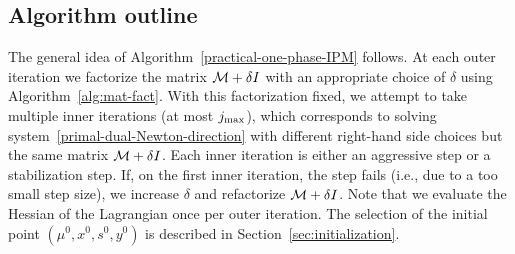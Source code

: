 \documentclass{article}
\begin{document}
\subsection{Algorithm outline}\label{sec:practical-alg-outline}

The general idea of Algorithm~\ref{practical-one-phase-IPM} follows. At each outer iteration we factorize the matrix $\mathcal{M} + \delta I$ with an appropriate choice of $\delta$ using Algorithm~\ref{alg:mat-fact}. With this factorization fixed, we attempt to take multiple inner iterations (at most $j_{\max}$), which corresponds to solving system~\eqref{primal-dual-Newton-direction} with different right-hand side choices but the same matrix $\mathcal{M} + \delta I$. Each inner iteration is either an aggressive step or a stabilization step. If, on the first inner iteration, the step fails (i.e., due to a too small step size), we increase $\delta$ and refactorize $\mathcal{M} + \delta I$. Note that we evaluate the Hessian of the Lagrangian once per outer iteration. The selection of the initial point $(\mu^{0}, x^{0}, s^{0}, y^{0})$ is described in Section~\ref{sec:initialization}.

\end{document}
